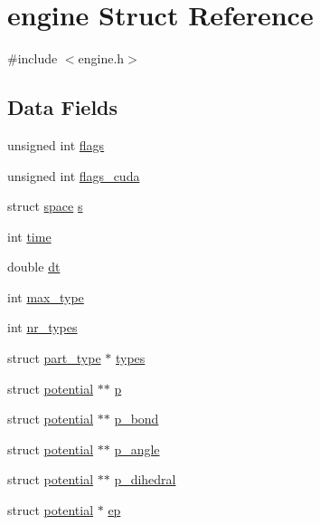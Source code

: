 \hypertarget{structengine}{\section{engine Struct Reference}
\label{structengine}
}


{\ttfamily \#include $<$engine.\-h$>$}

\subsection*{Data Fields}
\begin{DoxyCompactItemize}
\item 
unsigned int \hyperlink{structengine_ac92588540e8c1d014a08cd8a45462b19}{flags}
\item 
unsigned int \hyperlink{structengine_a4669eb2b5a527db6d15e894f6a37b3d8}{flags\-\_\-cuda}
\item 
struct \hyperlink{structspace}{space} \hyperlink{structengine_afbf1b94acbdcbdcd57558b82d9cc649f}{s}
\item 
int \hyperlink{structengine_a42715f65f02da52edc5b22021d8ae670}{time}
\item 
double \hyperlink{structengine_a03e28be41881b703c836edbfe9b51b17}{dt}
\item 
int \hyperlink{structengine_ac30f9e387650c2e0c70944a5d6bd8275}{max\-\_\-type}
\item 
int \hyperlink{structengine_a09fc8a1fc18fd82469354adc4e5789f7}{nr\-\_\-types}
\item 
struct \hyperlink{structpart__type}{part\-\_\-type} $\ast$ \hyperlink{structengine_a476fc4b80594201e7819214e03a97f11}{types}
\item 
struct \hyperlink{structpotential}{potential} $\ast$$\ast$ \hyperlink{structengine_a55e3996f3d2d21de5ba97f68400758e2}{p}
\item 
struct \hyperlink{structpotential}{potential} $\ast$$\ast$ \hyperlink{structengine_a15640f6c6966c68953b63d33dea07554}{p\-\_\-bond}
\item 
struct \hyperlink{structpotential}{potential} $\ast$$\ast$ \hyperlink{structengine_a9101bf6094ebf4f3d00c7d8299dfbacb}{p\-\_\-angle}
\item 
struct \hyperlink{structpotential}{potential} $\ast$$\ast$ \hyperlink{structengine_a517a9f921afc4c34b7466a96ad8dcd08}{p\-\_\-dihedral}
\item 
struct \hyperlink{structpotential}{potential} $\ast$ \hyperlink{structengine_a1ca1798430902a62f1f7daf91cc6005e}{ep}
\item 

\end{DoxyCompactItemize}
